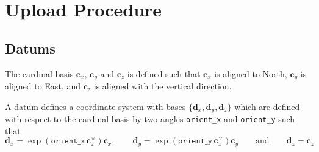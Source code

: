 \chapter{Upload Procedure}


\section{Datums}
The cardinal basis \(\mathbf{c}_x\), \(\mathbf{c}_y\) and \(\mathbf{c}_z\) is defined such that
\(\mathbf{c}_x\) is aligned to North, \(\mathbf{c}_y\) is aligned to East, and \(\mathbf{c}_z\)
is aligned with the vertical direction.

A datum defines a coordinate system with bases \(\{\mathbf{d}_x,\mathbf{d}_y,\mathbf{d}_z\}\) which are defined with respect to the cardinal basis by two angles \texttt{orient\_x} and \texttt{orient\_y} such that
\begin{equation*}
\mathbf{d}_x = \operatorname{exp}{\left(\texttt{orient\_x}\, \mathbf{c}_z^{\times}\right)} \mathbf{c}_x,
\qquad
\mathbf{d}_y = \operatorname{exp}{\left(\texttt{orient\_y}\, \mathbf{c}_z^{\times}\right)} \mathbf{c}_y
\qquad\text{and}\qquad
\mathbf{d}_z = \mathbf{c}_z
\end{equation*}

